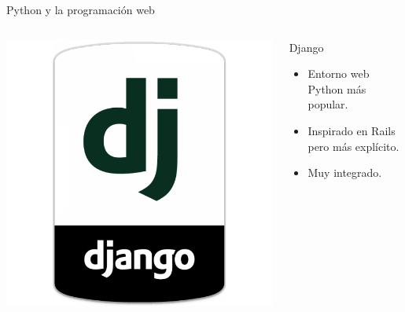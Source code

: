 \documentclass[bigger,unknownkeysallowed]{beamer}
\begin{document}
\begin{frame}[label={sec:org003f507}]{Python y la programación web}
\begin{columns}
\begin{column}{0.3\columnwidth}
\begin{center}
\begin{center}
\includegraphics[width=\textwidth]{django.png}
\end{center}
\end{center}
\end{column}
\begin{column}{0.7\columnwidth}
\begin{block}{Django}
\begin{itemize}
\item Entorno web Python más popular.

\item Inspirado en \alert{Rails} pero más explícito.

\item Muy integrado.
\end{itemize}
\end{block}
\end{column}
\end{columns}


\end{frame}
\end{document}
